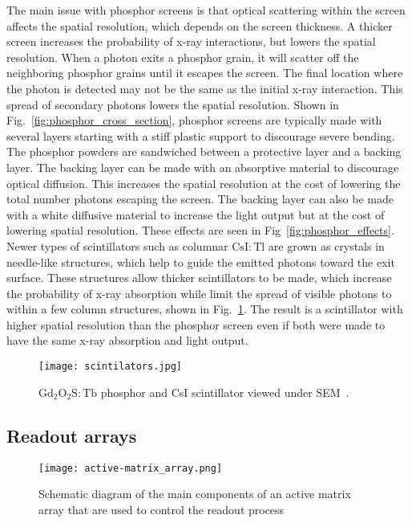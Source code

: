 The main issue with phosphor screens is that optical scattering within the screen affects the spatial resolution, which depends on the screen thickness.  A thicker screen increases the probability of x-ray interactions, but lowers the spatial resolution.  When a photon exits a phosphor grain, it will scatter off the neighboring phosphor grains until it escapes the screen.  The final location where the photon is detected may not be the same as the initial x-ray interaction.  This spread of secondary photons lowers the spatial resolution.  Shown in Fig.~\ref{fig:phosphor_cross_section}, phosphor screens are typically made with several layers starting with a stiff plastic support to discourage severe bending.  The phosphor powders are sandwiched between a protective layer and a backing layer.  The backing layer can be made with an absorptive material to discourage optical diffusion.  This increases the spatial resolution at the cost of lowering the total number photons escaping the screen.  The backing layer can also be made with a white diffusive material to increase the light output but at the cost of lowering spatial resolution.  These effects are seen in Fig~\ref{fig:phosphor_effects}.  Newer types of scintillators such as columnar $\mathrm{CsI:Tl}$ are grown as crystals in needle-like structures, which help to guide the emitted photons toward the exit surface.  These structures allow thicker scintillators to be made, which increase the probability of x-ray absorption while limit the spread of visible photons to within a few column structures, shown in Fig.~\ref{fig:scintillators}.  The result is a scintillator with higher spatial resolution than the phosphor screen even if both were made to have the same x-ray absorption and light output.


\begin{figure}[ht]
\texttt{[image: scintilators.jpg]}
\caption{$\mathrm{Gd_2O_2S:Tb}$ phosphor and CsI scintillator viewed under SEM~\citep{scintillatorImage}.}
\label{fig:scintillators}
\end{figure}

\subsection{Readout arrays}

\begin{figure}[ht]
\texttt{[image: active-matrix\_array.png]}
\caption[]{Schematic diagram of the main components of an active matrix array that are used to control the readout process\footnotemark~\citep{Fahrig2008}}
\label{fig:schematic_active-matrix_array}
\end{figure}

